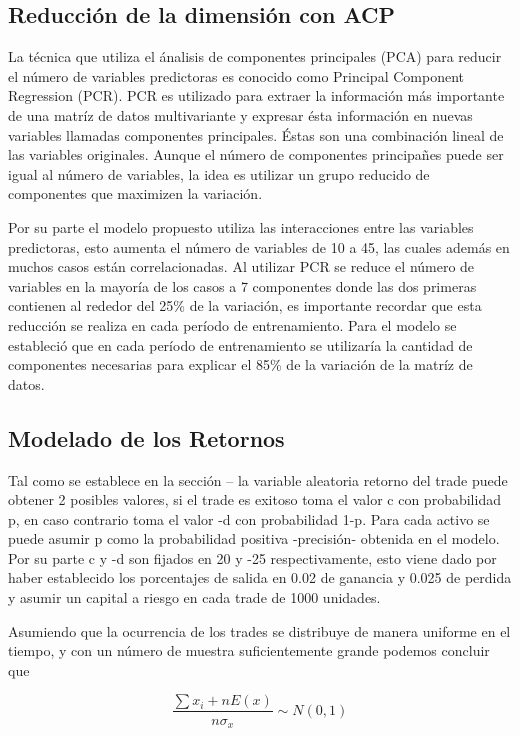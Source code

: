 \documentclass[a4paper,12pt]{Latex/Classes/PhDthesisPSnPDF}
\begin{document}
\subsection{Reducción de la dimensión con ACP}

La técnica que utiliza el ánalisis de componentes principales (PCA) para reducir el número de variables predictoras es conocido como Principal Component Regression (PCR). PCR es utilizado para extraer la información más importante de una matríz de datos multivariante y expresar ésta información en nuevas variables llamadas componentes principales. Éstas son una combinación lineal de las variables originales. Aunque el número de componentes principañes puede ser igual al número de variables, la idea es utilizar un grupo reducido de componentes que maximizen la variación.

Por su parte el modelo propuesto utiliza las interacciones entre las variables predictoras, esto aumenta el número de variables de 10 a 45, las cuales además en muchos casos están correlacionadas. Al utilizar PCR se reduce el número de variables en la mayoría de los casos a 7 componentes donde las dos primeras contienen al rededor del 25\% de la variación, es importante recordar que esta reducción se realiza en cada período de entrenamiento. Para el modelo se estableció que en cada período de entrenamiento se utilizaría la cantidad de componentes necesarias para explicar el 85\% de la variación de la matríz de datos.

\subsection{Modelado de los Retornos}

Tal como se establece en la sección -- la variable aleatoria retorno del trade puede obtener 2 posibles valores, si el trade es exitoso toma el valor c con probabilidad p, en caso contrario toma el valor -d con probabilidad 1-p. Para cada activo se puede asumir p como la probabilidad positiva -precisión- obtenida en el modelo. Por su parte c y -d son fijados en 20 y -25 respectivamente, esto viene dado por haber establecido los porcentajes de salida en 0.02 de ganancia y 0.025 de perdida y asumir un capital a riesgo en cada trade de 1000 unidades.

Asumiendo que la ocurrencia de los trades se distribuye de manera uniforme en el tiempo, y con un número de muestra suficientemente grande podemos concluir que

$$ \frac{\sum x_{i} + nE(x)}{n\sigma_{x}} \sim N(0,1) $$
\end{document}
